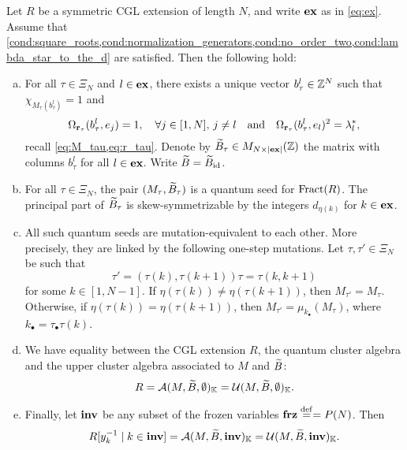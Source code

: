 \begin{theorem}\label{thm:gy_main_result}

	Let $R$ be a symmetric CGL extension of length $N$, and write $\mathbf{ex}$ as in \cref{eq:ex}.
	Assume that
	\cref{cond:square_roots,cond:normalization_generators,cond:no_order_two,cond:lambda_star_to_the_d}
	are satisfied. Then the following hold:
	\begin{enumerate}[(a)]
		\item For all $\tau \in \Xi_N$ and $l \in \mathbf{ex}$, there exists a unique vector $b^l_{\tau}\in
			      \mathbb{Z}^N$ such that $\chi_{M_\tau (b^l_\tau)} = 1$ and
		      \begin{equation*}
			      \Omega_{\mathbf{r}_\tau}(b^l_\tau, e_j) = 1, \quad \forall j\in [1, N],\,j\neq l \quad \text{and} \quad \Omega_{\mathbf{r}_\tau}(b^l_{\tau}, e_l)^2 = \lambda_l^*,
		      \end{equation*}
		      recall \cref{eq:M_tau,eq:r_tau}.
		      Denote by $\widetilde{B}_\tau \in M_{N \times |\mathbf{ex}|}(\mathbb{Z})$ the matrix with columns $b^l_\tau$
		      for all $l \in \mathbf{ex}$. Write $\widetilde{B} = \widetilde{B}_{\operatorname{id}}$.
		\item For all $\tau \in \Xi_N$, the pair $(M_\tau, \widetilde{B}_\tau)$ is a quantum seed for
		      $\operatorname{Fract}(R)$. The principal part of $\widetilde{B}_\tau$ is skew-symmetrizable by the integers
		      $d_{\eta(k)}$ for $k \in \mathbf{ex}$.
		\item All such quantum seeds are mutation-equivalent to each other. More precisely, they are
		      linked by the following one-step mutations. Let $\tau, \tau' \in \Xi_N$ be such that
		      \begin{equation*}
			      \tau' = (\tau(k), \tau(k+1))\tau = \tau (k, k+1)
		      \end{equation*}
		      for some $k\in [1, N-1]$. If $\eta(\tau(k)) \neq \eta(\tau(k+1))$, then $M_{\tau'} = M_\tau$. Otherwise, if $\eta(\tau(k)) = \eta(\tau(k+1))$, then $M_{\tau'} = \mu_{k_\bullet}(M_\tau)$, where $k_\bullet = \tau_\bullet \tau(k)$.
		\item We have equality between the CGL extension $R$, the quantum cluster algebra and the
		      upper cluster algebra associated to $M$ and $\widetilde{B}$:
		      \begin{equation*}
			      R = \mathcal{A}(M, \widetilde{B}, \emptyset)_{\mathbb{K}} = \mathcal{U}(M, \widetilde{B}, \emptyset)_{\mathbb{K}}.
		      \end{equation*}
		\item Finally, let $\mathbf{inv}$ be any subset of the frozen variables $\mathbf{frz} \overset{\mathrm{def}}{=} = P(N)$. Then
		      \begin{equation*}
			      R[y_k^{-1} \mid k \in \mathbf{inv}] = \mathcal{A}(M, \widetilde{B}, \mathbf{inv})_{\mathbb{K}} = \mathcal{U}(M, \widetilde{B}, \mathbf{inv})_{\mathbb{K}}.
		      \end{equation*}
	\end{enumerate}
\end{theorem}

